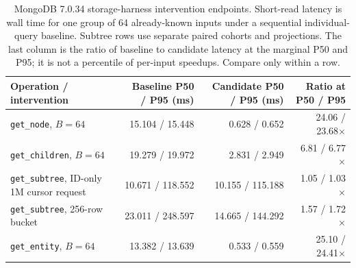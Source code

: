 \documentclass[10pt]{article}
\newcommand{\code}[1]{\texttt{#1}}
\newcommand{\hdr}{\rowcolor{hdrgray}}
\newenvironment{ctab}{\par\smallskip\centering\small
  \setlength{\tabcolsep}{5pt}\renewcommand{\arraystretch}{1.12}}{\par\smallskip}
\begin{document}
\begin{table}[H]
\caption{MongoDB 7.0.34 storage-harness intervention endpoints. Short-read latency is wall time for
one group of 64 already-known inputs under a sequential individual-query
baseline. Subtree rows use separate paired cohorts and projections. The last
column is the ratio of baseline to candidate latency at the marginal P50 and
P95; it is not a percentile of per-input speedups. Compare only within a row.}
\label{tab:optimizations}
\begin{ctab}
\setlength{\tabcolsep}{7pt}
\begin{tabular}{@{}lrrr@{}}
\toprule
\hdr Operation / intervention & Baseline P50 / P95 (ms) & Candidate P50 / P95 (ms) & Ratio at P50 / P95 \\
\midrule
\code{get\_node}, $B=64$     & 15.104 / 15.448 & 0.628 / 0.652 & 24.06 / 23.68$\times$ \\
\code{get\_children}, $B=64$ & 19.279 / 19.972 & 2.831 / 2.949 & 6.81 / 6.77$\times$ \\
\code{get\_subtree}, ID-only 1M cursor request
  & 10.671 / 118.552 & 10.155 / 115.188 & 1.05 / 1.03$\times$ \\
\code{get\_subtree}, 256-row bucket
  & 23.011 / 248.597 & 14.665 / 144.292 & 1.57 / 1.72$\times$ \\
\code{get\_entity}, $B=64$   & 13.382 / 13.639 & 0.533 / 0.559 & 25.10 / 24.41$\times$ \\
\bottomrule
\end{tabular}
\end{ctab}
\end{table}
\end{document}
